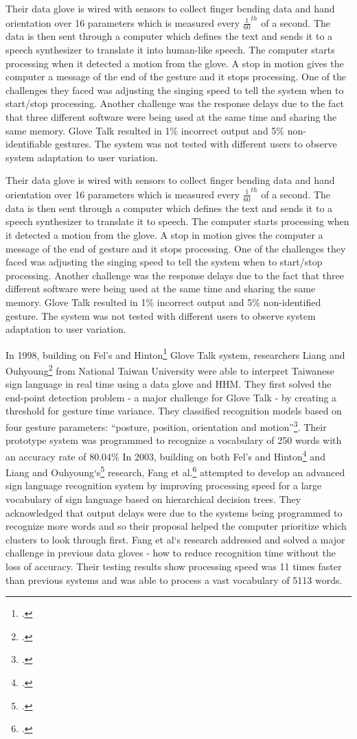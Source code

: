 Their data glove is wired with sensors to collect finger bending data and hand orientation over 16 parameters which is measured every $\frac{1}{60}^{th}$ of a second. The data is then sent through a computer which defines the text and sends it to a speech synthesizer to translate it into human-like speech. The computer starts processing when it detected a motion from the glove. A stop in motion gives the computer a message of the end of the gesture and it stops processing. One of the challenges they faced was adjusting the singing speed to tell the system when to start/stop processing. Another challenge was the response delays due to the fact that three different software were being used at the same time and sharing the same memory. Glove Talk resulted in 1\% incorrect output and 5\% non-identifiable gestures. The system was not tested with different users to observe system adaptation to user variation. 

Their data glove is wired with sensors to collect finger bending data and hand orientation over 16 parameters which is measured every $\frac{1}{60}^{th}$ of a second. The data is then sent through a computer which defines the text and sends it to a speech synthesizer to translate it to speech. The computer starts processing when it detected a motion from the glove. A stop in motion gives the computer a message of the end of gesture and it stops processing. One of the challenges they faced was adjusting the singing speed to tell the system when to start/stop processing. Another challenge was the response delays due to the fact that three different software were being used at the same time and sharing the same memory. Glove Talk resulted in 1\% incorrect output and 5\% non-identified gesture. The system was not tested with different users to observe system adaptation to user variation. 


In 1998, building on Fel’s and Hinton\footcite{Fels1993} Glove Talk system, researchers Liang and Ouhyoung\footcite{Liang1998} from National Taiwan University were able to interpret Taiwanese sign language in real time using a data glove and HHM. They first solved the end-point detection problem - a major challenge for Glove Talk - by creating a threshold for gesture time variance. They classified recognition models based on four gesture parameters: ``posture, position, orientation and motion''\footcite{Liang1998}. Their prototype system was programmed to recognize a vocabulary of 250 words with an accuracy rate of 80.04\%
In 2003, building on both Fel’s and Hinton\footcite{Fels1993} and Liang and Ouhyoung‘s\footcite{Liang1998} research, Fang et al.\footcite{Fang2003} attempted to develop an advanced sign language recognition system by improving processing speed for a large vocabulary of sign language based on hierarchical decision trees. They acknowledged that output delays were due to the systems being programmed to recognize more words and so their proposal helped the computer prioritize which clusters to look through first. Fang et al‘s research addressed and solved a major challenge in previous data gloves - how to reduce recognition time without the loss of accuracy. Their testing results show processing speed was 11 times faster than previous systems and was able to process a vast vocabulary of 5113 words.

